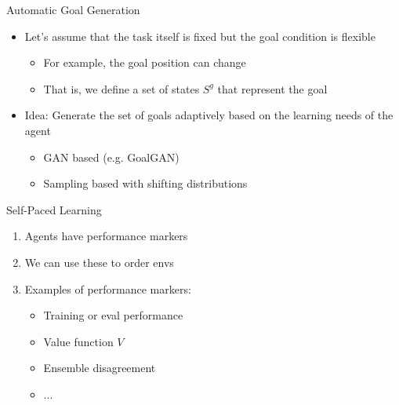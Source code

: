 \begin{frame}[c]{Automatic Goal Generation }
	
	\begin{itemize}
		\item Let's assume that the task itself is fixed but the goal condition is flexible
		\begin{itemize}
			\item For example, the goal position can change
			\item That is, we define a set of states $S^g$ that represent the goal
		\end{itemize}
		\pause
		\smallskip
		\item \alert{Idea:} Generate the set of goals adaptively based on the learning needs of the agent
		\begin{itemize}
			\item GAN based (e.g. GoalGAN)
			\item Sampling based with shifting distributions 
		\end{itemize}
	\end{itemize}
	
\end{frame}

\begin{frame}[c]{Self-Paced Learning}
	
	\begin{enumerate}
		\item Agents have performance markers
		\item We can use these to order envs
		\item Examples of performance markers:
		\begin{itemize}
			\item Training or eval performance
			\item Value function $V$
			\item Ensemble disagreement
			\item ...
		\end{itemize}
	\end{enumerate}
	
\end{frame}

